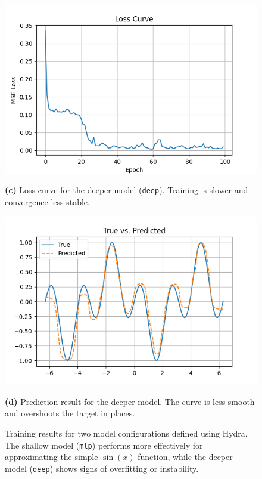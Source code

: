 \begin{figure}[ht]
  \begin{minipage}{0.48\textwidth}
    \centering
    \includegraphics[width=\linewidth]{images/hydra1_deep.png}
    \caption*{{\bf (c)} Loss curve for the deeper model (\texttt{deep}). Training is slower and convergence less stable.}
  \end{minipage}
  \hfill
  \begin{minipage}{0.48\textwidth}
    \centering
    \includegraphics[width=\linewidth]{images/hydra2_deep.png}
    \caption*{{\bf (d)} Prediction result for the deeper model. The curve is less smooth and overshoots the target in places.}
  \end{minipage}

  \caption{Training results for two model configurations defined using Hydra. The shallow model (\texttt{mlp}) performs more effectively for approximating the simple $\sin(x)$ function, while the deeper model (\texttt{deep}) shows signs of overfitting or instability.}
  \label{fig:hydra-mlp-comparison}
\end{figure}



